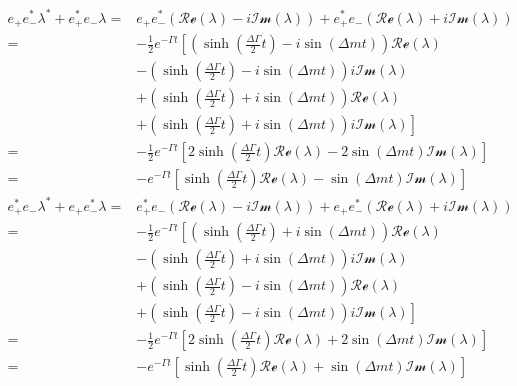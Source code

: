 \begin{align}
  e_{+}e_{-}^*\lambda^{\ast}+e_+^*e_-\lambda =& e_+e_-^*\left(\mathcal{Re}(\lambda)-i\mathcal{Im}(\lambda)\right)
  + e_+^*e_-\left(\mathcal{Re}(\lambda)+i\mathcal{Im}(\lambda)\right)\nonumber\\
  =& -\frac{1}{2}e^{-\Gamma t}\left[\left(\sinh\left(\frac{\Delta\Gamma}{2}t\right)-i\sin\left(\Delta m t\right)\right)\mathcal{Re}(\lambda)\right.\nonumber\\
  &-\left(\sinh\left(\frac{\Delta\Gamma}{2}t\right)-i\sin\left(\Delta m t\right)\right)i\mathcal{Im}(\lambda)\nonumber\\
  &+\left(\sinh\left(\frac{\Delta\Gamma}{2}t\right)+i\sin\left(\Delta m t\right)\right)\mathcal{Re}(\lambda)\nonumber\\
  &+\left.\left(\sinh\left(\frac{\Delta\Gamma}{2}t\right)+i\sin\left(\Delta m t\right)\right)i\mathcal{Im}(\lambda)\right]\nonumber\\
  =&-\frac{1}{2}e^{-\Gamma t}\left[2\sinh\left(\frac{\Delta\Gamma}{2}t\right)\mathcal{Re}(\lambda)-2\sin\left(\Delta mt\right)\mathcal{Im}(\lambda)\right]\nonumber\\
  =&-e^{-\Gamma t}\left[\sinh\left(\frac{\Delta\Gamma}{2}t\right)\mathcal{Re}(\lambda)-\sin\left(\Delta mt\right)\mathcal{Im}(\lambda)\right]\label{eq:result_1}\\
  e_{+}^*e_{-}\lambda^{\ast}+e_+e_-^*\lambda =& e_+^*e_-\left(\mathcal{Re}(\lambda)-i\mathcal{Im}(\lambda)\right)
  + e_+e_-^*\left(\mathcal{Re}(\lambda)+i\mathcal{Im}(\lambda)\right)\nonumber\\
  =& -\frac{1}{2}e^{-\Gamma t}\left[\left(\sinh\left(\frac{\Delta\Gamma}{2}t\right)+i\sin\left(\Delta m t\right)\right)\mathcal{Re}(\lambda)\right.\nonumber\\
  &-\left(\sinh\left(\frac{\Delta\Gamma}{2}t\right)+i\sin\left(\Delta m t\right)\right)i\mathcal{Im}(\lambda)\nonumber\\
  &+\left(\sinh\left(\frac{\Delta\Gamma}{2}t\right)-i\sin\left(\Delta m t\right)\right)\mathcal{Re}(\lambda)\nonumber\\
  &+\left.\left(\sinh\left(\frac{\Delta\Gamma}{2}t\right)-i\sin\left(\Delta m t\right)\right)i\mathcal{Im}(\lambda)\right]\nonumber\\
  =&-\frac{1}{2}e^{-\Gamma t}\left[2\sinh\left(\frac{\Delta\Gamma}{2}t\right)\mathcal{Re}(\lambda)+2\sin\left(\Delta mt\right)\mathcal{Im}(\lambda)\right]\nonumber\\
  =&-e^{-\Gamma t}\left[\sinh\left(\frac{\Delta\Gamma}{2}t\right)\mathcal{Re}(\lambda)+\sin\left(\Delta mt\right)\mathcal{Im}(\lambda)\right]\label{eq:result_2}
\end{align}
